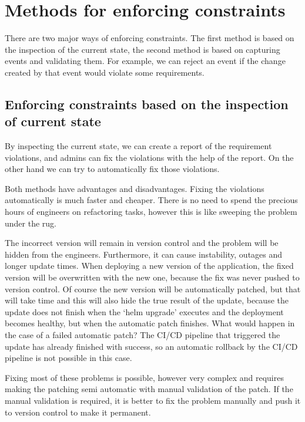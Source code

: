 \setlength{\parindent}{0pt}
\setlength{\parskip}{0.6em}

\chapter{Methods for enforcing constraints}
\label{chap:enforcingMethods}

There are two major ways of enforcing constraints. The first method is based on the inspection of the current state, the second method is based on capturing events and validating them. For example, we can reject an event if the change created by that event would violate some requirements.

\section[State inspection based]{Enforcing constraints based on the inspection of current state}

By inspecting the current state, we can create a report of the requirement violations, and admins can fix the violations with the help of the report. On the other hand we can try to automatically fix those violations.

Both methods have advantages and disadvantages. Fixing the violations automatically is much faster and cheaper. There is no need to spend the precious hours of engineers on refactoring tasks, however this is like sweeping the problem under the rug. 

The incorrect version will remain in version control and the problem will be hidden from the engineers. Furthermore, it can cause instability, outages and longer update times. When deploying a new version of the application, the fixed version will be overwritten with the new one, because the fix was never pushed to version control. Of course the new version will be automatically patched, but that will take time and this will also hide the true result of the update, because the update does not finish when the `helm upgrade' executes and the deployment becomes healthy, but when the automatic patch finishes. What would happen in the case of a failed automatic patch? The CI/CD pipeline that triggered the update has already finished with success, so an automatic rollback by the CI/CD pipeline is not possible in this case.

Fixing most of these problems is possible, however very complex and requires making the patching semi automatic with manual validation of the patch. If the manual validation is required, it is better to fix the problem manually and push it to version control to make it permanent.


